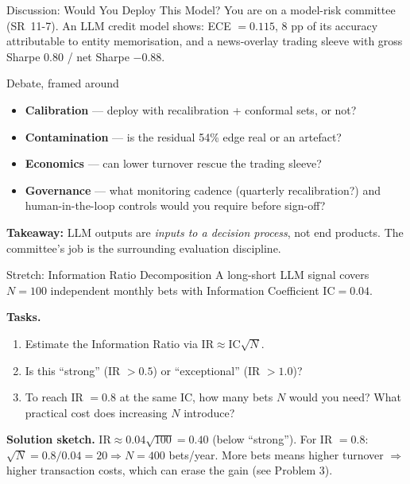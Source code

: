 \documentclass[9pt,t]{beamer}
\begin{document}
\begin{frame}{Discussion: Would You Deploy This Model?}
You are on a model-risk committee (SR~11-7). An LLM credit model shows:
ECE $=0.115$, 8 pp of its accuracy attributable to entity memorisation, and a
news-overlay trading sleeve with gross Sharpe 0.80 / net Sharpe $-0.88$.

\medskip
\begin{block}{Debate, framed around}
\begin{itemize}
  \item \textbf{Calibration} --- deploy with recalibration + conformal sets, or not?
  \item \textbf{Contamination} --- is the residual 54\% edge real or an artefact?
  \item \textbf{Economics} --- can lower turnover rescue the trading sleeve?
  \item \textbf{Governance} --- what monitoring cadence (quarterly recalibration?)
        and human-in-the-loop controls would you require before sign-off?
\end{itemize}
\end{block}

\medskip
\textbf{Takeaway:} LLM outputs are \emph{inputs to a decision process}, not end
products. The committee's job is the surrounding evaluation discipline.
\end{frame}


\begin{frame}[noframenumbering]{Stretch: Information Ratio Decomposition}
A long-short LLM signal covers $N = 100$ independent monthly bets with
Information Coefficient $\text{IC} = 0.04$.

\medskip
\textbf{Tasks.}
\begin{enumerate}
  \item Estimate the Information Ratio via $\text{IR} \approx \text{IC}\sqrt{N}$.
  \item Is this ``strong'' (IR $>0.5$) or ``exceptional'' (IR $>1.0$)?
  \item To reach IR $=0.8$ at the same IC, how many bets $N$ would you need? What
        practical cost does increasing $N$ introduce?
\end{enumerate}

\medskip
\textbf{Solution sketch.}
$\text{IR} \approx 0.04\sqrt{100} = 0.40$ (below ``strong''). For IR $=0.8$:
$\sqrt{N} = 0.8/0.04 = 20 \Rightarrow N = 400$ bets/year. More bets means higher
turnover $\Rightarrow$ higher transaction costs, which can erase the gain
(see Problem 3).
\end{frame}
\end{document}
